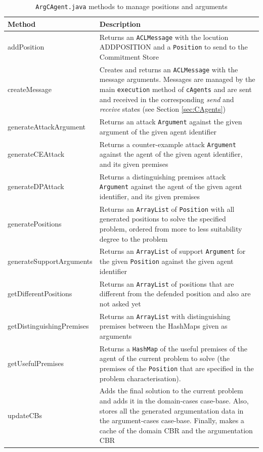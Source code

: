 \begin{table}[h!t]
\begin{tabulary}{1\linewidth}{|l|L|}
\hline
\textbf{Method} & \textbf{Description} \\
\hline
addPosition & Returns an \texttt{ACLMessage} with the locution ADDPOSITION and a \texttt{Position} to send to the Commitment Store\\
\hline
createMessage & Creates and returns an \texttt{ACLMessage} with the message arguments. Messages are managed by the main \texttt{execution} method of \texttt{cAgents} and are sent and received in the corresponding \textit{send} and \textit{receive} states (see Section \ref{sec:CAgents})\\
\hline
generateAttackArgument & Returns an attack \texttt{Argument} against the given argument of the given agent identifier\\
\hline
generateCEAttack & Returns a counter-example attack \texttt{Argument} against the agent of the given agent identifier, and its given premises\\
\hline
generateDPAttack & Returns a distinguishing premises attack \texttt{Argument} against the agent of the given agent identifier, and its given premises\\
\hline
 generatePositions & Returns an \texttt{ArrayList} of \texttt{Position} with all generated positions to solve the specified problem, ordered from more to less suitability degree to the problem\\
\hline
generateSupportArguments & Returns an \texttt{ArrayList} of support \texttt{Argument} for the given \texttt{Position} against the given agent identifier\\
\hline
getDifferentPositions & Returns an \texttt{ArrayList} of positions that are different from the defended position and also are not asked yet\\
\hline
getDistinguishingPremises & Returns an \texttt{ArrayList} with distinguishing premises between the HashMaps given as arguments\\
\hline
getUsefulPremises & Returns a \texttt{HashMap} of the useful premises of the agent of the current problem to solve (the premises of the \texttt{Position} that are specified in the problem characterisation).\\
\hline
updateCBs & Adds the final solution to the current problem and adds it in the domain-cases case-base. Also, stores all the generated argumentation data in the argument-cases case-base. Finally, makes a cache of the domain CBR and the argumentation CBR\\
\hline
\end{tabulary}
\caption{\lstinline{ArgCAgent.java} methods to manage positions and arguments}
\label{tab:ArgCAgentMethods}
\end{table}

